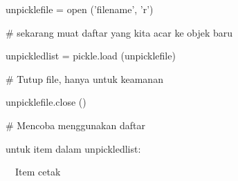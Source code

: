 {\fontsize{10pt}{10pt}\selectfont unpicklefile = open ('filename', 'r')} \par
\noindent 
\vspace{10pt}
\noindent 
{\fontsize{10pt}{10pt}\selectfont  $  \#  $ sekarang muat daftar yang kita acar ke objek baru} \par
\noindent 
{\fontsize{10pt}{10pt}\selectfont unpickledlist = pickle.load (unpicklefile)} \par
\noindent 
\vspace{10pt}
\noindent 
{\fontsize{10pt}{10pt}\selectfont  $  \#  $ Tutup file, hanya untuk keamanan} \par
\noindent 
{\fontsize{10pt}{10pt}\selectfont unpicklefile.close ()} \par
\noindent 
\vspace{10pt}
\noindent 
{\fontsize{10pt}{10pt}\selectfont  $  \#  $ Mencoba menggunakan daftar} \par
\noindent 
{\fontsize{10pt}{10pt}\selectfont untuk item dalam unpickledlist:} \par
\noindent 
{\fontsize{10pt}{10pt}\selectfont  $  $ $  $ $  $ $  $Item cetak} \par
\vspace{14pt}
